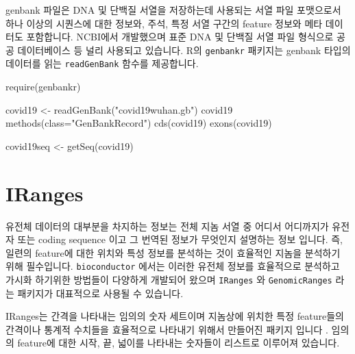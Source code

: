 \documentclass[
]{book}
\newenvironment{Shaded}{\begin{snugshade}}{\end{snugshade}}
\newcommand{\AttributeTok}[1]{\textcolor[rgb]{0.77,0.63,0.00}{#1}}
\newcommand{\FunctionTok}[1]{\textcolor[rgb]{0.00,0.00,0.00}{#1}}
\newcommand{\NormalTok}[1]{#1}
\newcommand{\OtherTok}[1]{\textcolor[rgb]{0.56,0.35,0.01}{#1}}
\newcommand{\StringTok}[1]{\textcolor[rgb]{0.31,0.60,0.02}{#1}}
\begin{document}
genbank 파일은 DNA 및 단백질 서열을 저장하는데 사용되는 서열 파일 포맷으로서 하나 이상의 시퀀스에 대한 정보와, 주석, 특정 서열 구간의 feature 정보와 메타 데이터도 포함합니다. NCBI에서 개발했으며 표준 DNA 및 단백질 서열 파일 형식으로 공공 데이터베이스 등 널리 사용되고 있습니다. R의 \texttt{genbankr} 패키지는 genbank 타입의 데이터를 읽는 \texttt{readGenBank} 함수를 제공합니다.

\begin{Shaded}
\begin{Highlighting}[]
\FunctionTok{require}\NormalTok{(genbankr)}

\NormalTok{covid19 }\OtherTok{\textless{}{-}} \FunctionTok{readGenBank}\NormalTok{(}\StringTok{"covid19wuhan.gb"}\NormalTok{)}
\NormalTok{covid19}
\FunctionTok{methods}\NormalTok{(}\AttributeTok{class=}\StringTok{"GenBankRecord"}\NormalTok{)}
\FunctionTok{cds}\NormalTok{(covid19)}
\FunctionTok{exons}\NormalTok{(covid19)}

\NormalTok{covid19seq }\OtherTok{\textless{}{-}} \FunctionTok{getSeq}\NormalTok{(covid19)}
\end{Highlighting}
\end{Shaded}

\hypertarget{iranges}{%
\section{IRanges}\label{iranges}}

유전체 데이터의 대부분을 차지하는 정보는 전체 지놈 서열 중 어디서 어디까지가 유전자 또는 coding sequence 이고 그 번역된 정보가 무엇인지 설명하는 정보 입니다. 즉, 일련의 feature에 대한 위치와 특성 정보를 분석하는 것이 효율적인 지놈을 분석하기 위해 필수입니다. \texttt{bioconductor} 에서는 이러한 유전체 정보를 효율적으로 분석하고 가시화 하기위한 방법들이 다양하게 개발되어 왔으며 \texttt{IRanges} 와 \texttt{GenomicRanges} 라는 패키지가 대표적으로 사용될 수 있습니다.

IRanges는 간격을 나타내는 임의의 숫자 세트이며 지놈상에 위치한 특정 feature들의 간격이나 통계적 수치들을 효율적으로 나타내기 위해서 만들어진 패키지 입니다 \citep{Lawrence2013}. 임의의 feature에 대한 시작, 끝, 넓이를 나타내는 숫자들이 리스트로 이루어져 있습니다.
\end{document}
